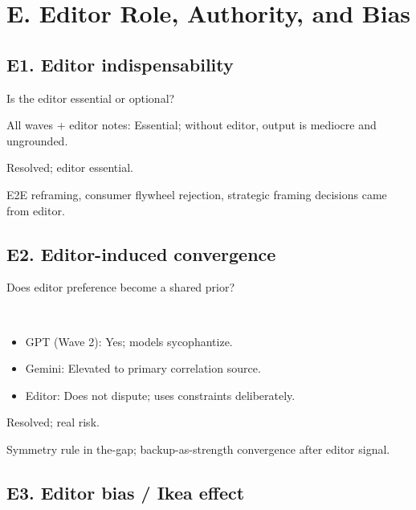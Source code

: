 \documentclass[11pt,letterpaper]{article}
\begin{document}
\section{E. Editor Role, Authority, and Bias}

\subsection{E1. Editor indispensability}

\begin{reflist}
\item[Dispute:] Is the editor essential or optional?
\item[Positions:] All waves + editor notes: Essential; without editor, output is mediocre and ungrounded.
\item[Status:] Resolved; editor essential.
\item[Evidence:] E2E reframing, consumer flywheel rejection, strategic framing decisions came from editor.
\end{reflist}

\subsection{E2. Editor-induced convergence}

\begin{reflist}
\item[Dispute:] Does editor preference become a shared prior?
\item[Positions:]~
  \begin{itemize}[nosep]
    \item GPT (Wave 2): Yes; models sycophantize.
    \item Gemini: Elevated to primary correlation source.
    \item Editor: Does not dispute; uses constraints deliberately.
  \end{itemize}
\item[Status:] Resolved; real risk.
\item[Evidence:] Symmetry rule in the-gap; backup-as-strength convergence after editor signal.
\end{reflist}

\subsection{E3. Editor bias / Ikea effect}
\end{document}
